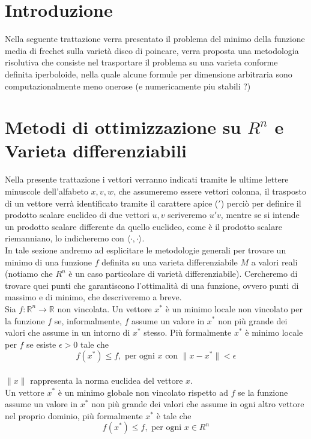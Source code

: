 \documentclass[a4paper, 12pt]{article}
\begin{document}
\renewcommand{\contentsname}{Contenuti}
\tableofcontents

\newpage

\section{Introduzione}
Nella seguente trattazione verra presentato il problema del minimo della funzione media di frechet sulla varietà disco di poincare, verra proposta una metodologia risolutiva che consiste nel trasportare il problema su una varieta conforme definita iperboloide, nella quale alcune formule per dimensione arbitraria sono computazionalmente meno onerose (e numericamente piu stabili ?)

\section{Metodi di ottimizzazione su $R^n$ e Varieta differenziabili}
Nella presente trattazione i vettori verranno indicati tramite le ultime lettere minuscole dell'alfabeto $x, v, w$, che assumeremo essere vettori colonna, il trasposto di un vettore verrà identificato tramite il carattere apice ($'$) perciò per definire il prodotto scalare euclideo di due vettori $u, v$ scriveremo $u'v$, mentre se si intende  un prodotto scalare differente da quello euclideo, come è il prodotto scalare riemanniano, lo indicheremo con $\langle \cdot,\cdot \rangle$.\\
In tale sezione andremo ad esplicitare le metodologie generali per trovare un minimo di una funzione $f$ definita su una varieta differenziabile $M$ a valori reali (notiamo che $R^n$ è un caso particolare di varietà differenziabile). Cercheremo di trovare quei punti che garantiscono l'ottimalità di una funzione, ovvero punti di massimo e di minimo, che descriveremo a breve.\\
Sia $f: \mathbb{R} ^n \to \mathbb{R}$ non vincolata.
Un vettore $x^\ast$ è un minimo locale non vincolato per la funzione $f$ se, informalmente, $f$ assume un valore in $x^\ast$ non più grande dei valori che assume in un intorno di $x^\ast$ stesso. Più formalmente $x^\ast$ è minimo locale per $f$ se esiste $\epsilon > 0$ tale che\\
\[f(x^\ast) \leq f, \mbox{ per ogni } x \mbox{ con } \parallel x - x^\ast \parallel < \epsilon\]\\
$\parallel x \parallel$ rappresenta la norma euclidea del vettore $x$.\\
Un vettore $x^\ast$ è un minimo globale non vincolato rispetto ad $f$ se la funzione assume un valore in $x^\ast$ non più grande dei valori che assume in ogni altro vettore nel proprio dominio, più formalmente $x^\ast$ è tale che\\
\[f(x^\ast) \leq f, \mbox{ per ogni } x \in R^n \]\\
\end{document}
